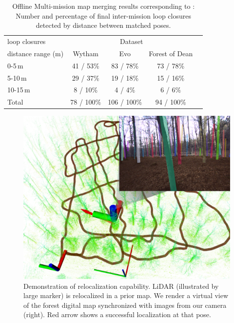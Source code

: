 

\begin{table}[htbp]
  \centering
  \small
  \begin{tabular}{p{2cm}cccc}
      \toprule
      \multicolumn{1}{l}{loop closures} & \multicolumn{3}{c}{Dataset} \\
      \multicolumn{1}{l}{distance range (m)} & Wytham & Evo & Forest of Dean \\
      \midrule
      0-5\,m &41 / 53\%  &83 / 78\%  &73 / 78\% \\
      \midrule
      5-10\,m &29 / 37\%  &19 / 18\% &15 / 16\%\\
      \midrule
      10-15\,m &8 / 10\%  &4 / 4\%   &6 / 6\% \\
      \midrule
      Total  & 78 / 100\%  & 106 / 100\%  & 94 / 100\% \\
      \bottomrule
  \end{tabular}
  \caption{Offline Multi-mission map merging results corresponding to : Number and percentage of final inter-mission loop closures detected by distance between matched poses.
  }  
  \label{tab:exp_offline_distance_table}
\end{table}


\begin{figure}[t]
  \centering
  \includegraphics[width=0.99\linewidth]{pics/relocalization_demo.png}
  \caption{Demonstration of relocalization capability. LiDAR (illustrated by large marker) is relocalized in a prior map. We render a virtual view of the forest digital map synchronized with images from our camera (right). Red arrow shows a successful localization at that pose.
  }
  \label{fig:relocalization}
\end{figure}


